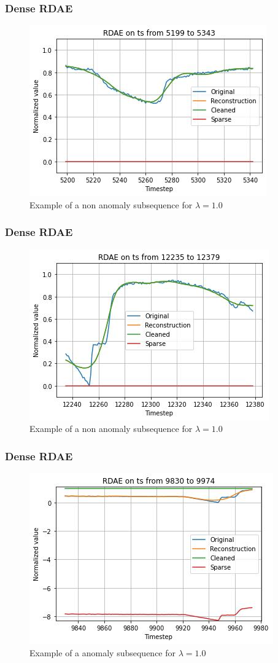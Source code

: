 \documentclass{beamer}
\theoremstyle{plain}
\theoremstyle{definition}
\theoremstyle{remark}
\begin{document}
\begin{frame}
	\frametitle{Dense RDAE}
	\begin{figure}
		\centering
		\includegraphics[width=0.7\linewidth]{Images/lam1.0ts_non_anomaly5199.jpg}
		\caption[]{Example of a non anomaly subsequence for $\lambda=1.0$}
	\end{figure}
\end{frame}

\begin{frame}
	\frametitle{Dense RDAE}
	\begin{figure}
		\centering
		\includegraphics[width=0.7\linewidth]{Images/lam1.0ts_non_anomaly12235.jpg}
		\caption[]{Example of a non anomaly subsequence for $\lambda=1.0$}
	\end{figure}
\end{frame}

\begin{frame}
	\frametitle{Dense RDAE}
	\begin{figure}
		\centering
		\includegraphics[width=0.7\linewidth]{Images/lam1.0ts_anomaly9830.jpg}
		\caption[]{Example of a anomaly subsequence for $\lambda=1.0$}
	\end{figure}
\end{frame}
\end{document}

